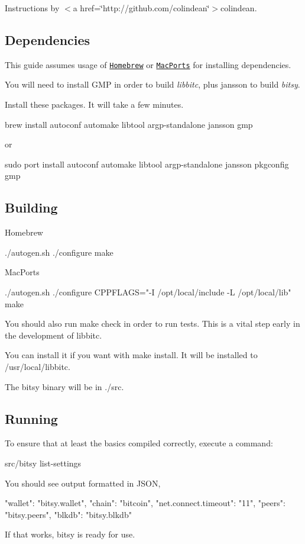 Instructions by $<$a href=\char`\"{}http\-://github.\-com/colindean\char`\"{}$>$colindean.

\subsection*{Dependencies }

This guide assumes usage of \href{http://brew.sh}{\tt Homebrew} or \href{https://www.macports.org}{\tt Mac\-Ports} for installing dependencies.

You will need to install {\ttfamily G\-M\-P} in order to build {\itshape libbitc}, plus {\ttfamily jansson} to build {\itshape bitsy}.

Install these packages. It will take a few minutes. \begin{DoxyVerb}brew install autoconf automake libtool argp-standalone jansson gmp
\end{DoxyVerb}


or \begin{DoxyVerb}sudo port install autoconf automake libtool argp-standalone jansson pkgconfig gmp
\end{DoxyVerb}


\subsection*{Building }

Homebrew \begin{DoxyVerb}./autogen.sh
./configure
make
\end{DoxyVerb}


Mac\-Ports \begin{DoxyVerb}./autogen.sh
./configure CPPFLAGS="-I /opt/local/include -L /opt/local/lib"
make
\end{DoxyVerb}


You should also run {\ttfamily make check} in order to run tests. This is a vital step early in the development of {\ttfamily libbitc}.

You can install it if you want with {\ttfamily make install}. It will be installed to {\ttfamily /usr/local/libbitc}.

The {\ttfamily bitsy} binary will be in {\ttfamily ./src}.

\subsection*{Running }

To ensure that at least the basics compiled correctly, execute a command\-: \begin{DoxyVerb}src/bitsy list-settings
\end{DoxyVerb}


You should see output formatted in J\-S\-O\-N, \begin{DoxyVerb}{
  "wallet": "bitsy.wallet",
  "chain": "bitcoin",
  "net.connect.timeout": "11",
  "peers": "bitsy.peers",
  "blkdb": "bitsy.blkdb"
}
\end{DoxyVerb}


If that works, {\ttfamily bitsy} is ready for use. 